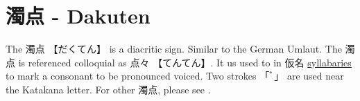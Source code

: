 \section{濁点 - Dakuten} \label{sec:Dakuten}

The {濁点} {【だくてん】} is a diacritic sign. Similar to the German Umlaut.
The {濁点} is referenced colloquial as {点々} {【てんてん】}.  It us used to in
{仮名} \hyperref[sec:Syllable]{syllabaries} to mark a consonant to be
pronounced voiced. Two strokes {「ﾞ」} are used near the Katakana letter.  For
other {濁点}, please see .

